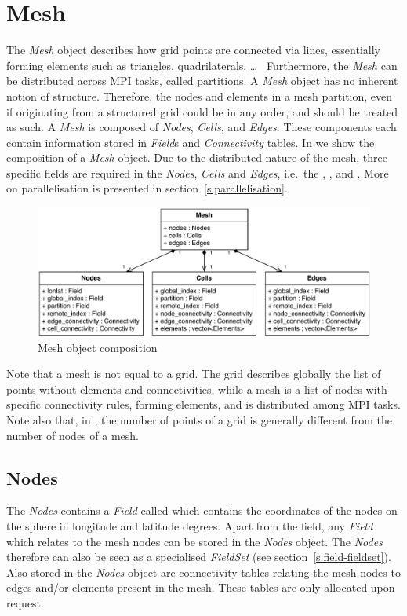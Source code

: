 \section{Mesh} \label{s:mesh}
%
The \emph{Mesh} object describes how grid points are connected via lines,
essentially forming elements such as triangles, quadrilaterals, \ldots~
Furthermore, the \emph{Mesh} can be distributed across MPI tasks, called
partitions.
%
A \emph{Mesh} object has no inherent notion of structure. Therefore, 
the nodes and elements in a mesh partition, even if originating from
a structured grid could be in any order, and should be treated as such.
A \emph{Mesh} is composed of \emph{Nodes}, \emph{Cells}, and \emph{Edges}.
These components each contain information stored in \emph{Field}s and 
\emph{Connectivity} tables. In  we show the composition
of a \emph{Mesh} object. Due to the distributed nature of the mesh,
three specific fields are required in the \emph{Nodes}, \emph{Cells}
and \emph{Edges}, i.e.~the , ,
and . More on parallelisation is presented in
section~\ref{s:parallelisation}.
%
\begin{figure}
\centering
\includegraphics[width=\textwidth]{imgs/mesh.pdf}
\caption{Mesh object composition \label{fig:mesh}}
\end{figure}
%
\begin{warningbox}
Note that a mesh is not equal to a grid. The grid describes globally the list
of points without elements and connectivities, while a mesh is a list of nodes
with specific connectivity rules, forming elements, and is distributed among
MPI tasks. Note also that, in \Atlas, the number of points of a grid is
generally different from the number of nodes of a mesh.
\end{warningbox}

\subsection{Nodes}
%
The \emph{Nodes} contains a \emph{Field} called  which contains
the coordinates of the nodes on the sphere in longitude and latitude
degrees. Apart from the  field, any \emph{Field} which relates
to the mesh nodes can be stored in the \emph{Nodes} object. The \emph{Nodes}
therefore can also be seen as a specialised \emph{FieldSet}
(see section~\ref{s:field-fieldset}).\\
%
Also stored in the \emph{Nodes} object are connectivity tables relating the
mesh nodes to edges and/or elements present in the mesh. These tables are
only allocated upon request.

